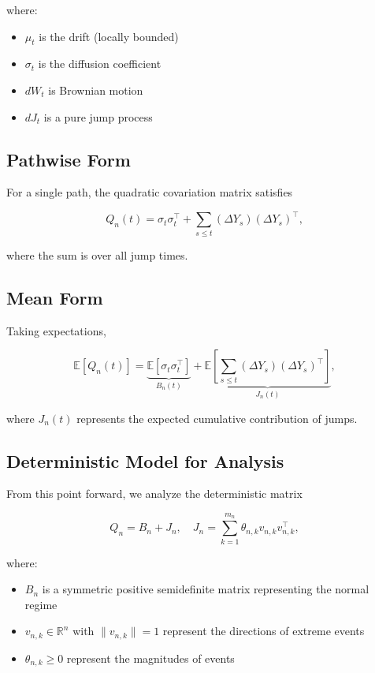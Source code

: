 \documentclass{article}
\begin{document}
where:
\begin{itemize}
\item \(\mu_t\) is the drift (locally bounded)
\item \(\sigma_t\) is the diffusion coefficient
\item \(dW_t\) is Brownian motion
\item \(dJ_t\) is a pure jump process
\end{itemize}

\subsection{Pathwise Form}

For a single path, the quadratic covariation matrix satisfies

\[
Q_n(t) = \sigma_t \sigma_t^\top + \sum_{s \le t} (\Delta Y_s)(\Delta Y_s)^\top,
\]

where the sum is over all jump times.

\subsection{Mean Form}

Taking expectations,

\[
\mathbb{E}[Q_n(t)] = \underbrace{\mathbb{E}[\sigma_t \sigma_t^\top]}_{B_n(t)} + \underbrace{\mathbb{E}\left[\sum_{s \le t} (\Delta Y_s)(\Delta Y_s)^\top\right]}_{J_n(t)},
\]

where \(J_n(t)\) represents the expected cumulative contribution of jumps.

\subsection{Deterministic Model for Analysis}

From this point forward, we analyze the deterministic matrix

\[
Q_n = B_n + J_n, \quad J_n = \sum_{k=1}^{m_n} \theta_{n,k} v_{n,k} v_{n,k}^\top,
\]

where:
\begin{itemize}
\item \(B_n\) is a symmetric positive semidefinite matrix representing the normal regime
\item \(v_{n,k} \in \mathbb{R}^n\) with \(\|v_{n,k}\| = 1\) represent the directions of extreme events
\item \(\theta_{n,k} \ge 0\) represent the magnitudes of events
\end{itemize}
\end{document}

